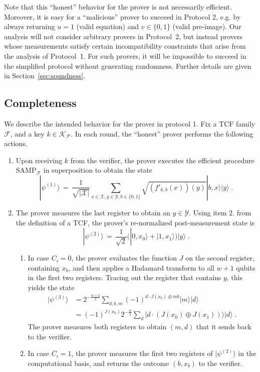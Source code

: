 \documentclass[11pt]{article}
\theoremstyle{remark}
\theoremstyle{definition}
\newcommand{\ket}[1]{|#1\rangle}
\newcommand{\mY}{\ensuremath{\mathcal{Y}}}
\newcommand{\inj}{J}
\newcommand{\sX}{\mathcal{X}}
\newcommand{\sY}{\mathcal{Y}}
\begin{document}
Note that this ``honest'' behavior for the prover is not necessarily efficient. Moreover, it is easy for a ``malicious'' prover to succeed in Protocol 2, e.g. by always returning $u=1$ (valid equation) and $v\in\{0,1\}$ (valid pre-image). Our analysis will not consider arbitrary provers in Protocol~2, but instead provers whose measurements satisfy certain incompatibility constraints that arise from the analysis of Protocol~1. For such provers, it will be impossible to succeed in the simplified protocol without generating randomness. Further details are given in Section~\ref{sec:soundness}.


\subsection{Completeness}
\label{sec:completeness}

We describe the intended behavior for the prover in protocol 1. Fix a TCF family $\mathcal{F}$, and a key $k\in\mathcal{K}_\mathcal{F}$. In each round, the ``honest'' prover performs the following actions.
\begin{enumerate}
\item Upon receiving $k$ from the verifier, the prover executes the efficient procedure  SAMP$_{\mathcal{F}}$ in superposition to obtain the state
\[ \ket{\psi^{(1)}}\,=\,    \frac{1}{\sqrt{|\sX|}}\sum_{x\in \sX,y\in \sY,b\in\{0,1\}}\sqrt{(f'_{k,b}(x))(y)}\ket{b,x}\ket{y}\;.\]
\item The prover measures the last register to obtain an $y\in\mY$. Using item 2. from the definition of a TCF, the prover's re-normalized post-measurement state is
\[\ket{\psi^{(2)}} \,=\, \frac{1}{\sqrt{2}}\big(\ket{0,x_0}+\ket{1,x_1}\big)\ket{y}\;.\]
\begin{enumerate}
\item In case $C_i=0$, the prover evaluates the function $\inj$ on the second register, containing $x_b$, and then applies a Hadamard transform to all $w+1$ qubits in the first two registers. Tracing out the register that contains $y$, this yields the state 
\begin{align*}
\ket{\psi^{(3)}} &= 2^{-\frac{w+2}{2}}  \sum_{d,b,m} (-1)^{d\cdot \inj(x_b)\oplus mb} \ket{m}\ket{d}\\
&= (-1)^{\inj(x_0)} 2^{-\frac{w}{2}}  \sum_{d} \ket{d\cdot (\inj(x_0)\oplus \inj(x_1))}\ket{d}\;.
\end{align*}
The prover measures both registers to obtain $(m,d)$ that it sends back to the verifier. 
\item In case $C_i=1$, the prover measures the first two registers of $\ket{\psi^{(2)}}$ in the computational basis, and returns the outcome $(b,x_b)$ to the verifier.
\end{enumerate}
\end{enumerate}
\end{document}
